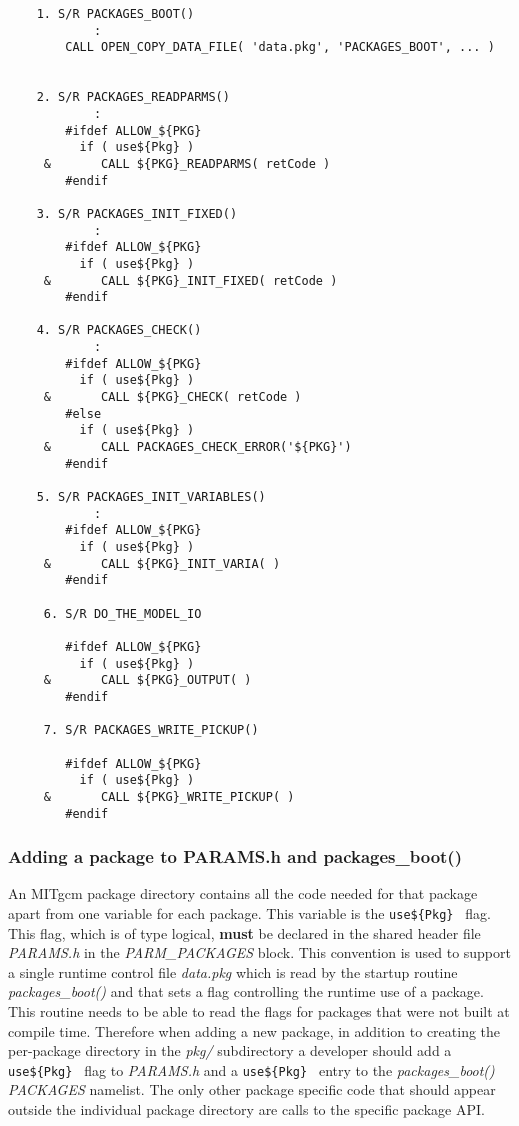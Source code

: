 {\footnotesize
\begin{verbatim}
    1. S/R PACKAGES_BOOT()
            :
        CALL OPEN_COPY_DATA_FILE( 'data.pkg', 'PACKAGES_BOOT', ... )
 

    2. S/R PACKAGES_READPARMS()
            :
        #ifdef ALLOW_${PKG}
          if ( use${Pkg} )
     &       CALL ${PKG}_READPARMS( retCode )
        #endif

    3. S/R PACKAGES_INIT_FIXED()
            :
        #ifdef ALLOW_${PKG}
          if ( use${Pkg} )
     &       CALL ${PKG}_INIT_FIXED( retCode )
        #endif

    4. S/R PACKAGES_CHECK()
            :
        #ifdef ALLOW_${PKG}
          if ( use${Pkg} )
     &       CALL ${PKG}_CHECK( retCode )
        #else
          if ( use${Pkg} )
     &       CALL PACKAGES_CHECK_ERROR('${PKG}')
        #endif

    5. S/R PACKAGES_INIT_VARIABLES()
            :
        #ifdef ALLOW_${PKG}
          if ( use${Pkg} )
     &       CALL ${PKG}_INIT_VARIA( )
        #endif

     6. S/R DO_THE_MODEL_IO

        #ifdef ALLOW_${PKG}
          if ( use${Pkg} )
     &       CALL ${PKG}_OUTPUT( )
        #endif

     7. S/R PACKAGES_WRITE_PICKUP()

        #ifdef ALLOW_${PKG}
          if ( use${Pkg} )
     &       CALL ${PKG}_WRITE_PICKUP( )
        #endif\end{verbatim}
}


\subsubsection{Adding a package to PARAMS.h and  packages\_boot()}

An MITgcm package directory contains all the code needed for that package apart
from one variable for each package. This variable is the {\tt use\$\{Pkg\} } 
flag. This flag, which is of type logical, {\bf must} be declared in the 
shared header file {\it PARAMS.h} in the {\it PARM\_PACKAGES} block. This 
convention is used to support a single runtime control file {\it data.pkg} 
which is read by the startup routine {\it packages\_boot()} and that sets a 
flag controlling the runtime use of a package. This routine needs to be able to 
read the flags for packages that were not built at compile time. Therefore
when adding a new package, in addition to creating the per-package directory
in the {\it pkg/} subdirectory a developer should add a {\tt use\$\{Pkg\} }
flag to {\it PARAMS.h} and a {\tt use\$\{Pkg\} } entry to the 
{\it packages\_boot()} {\it PACKAGES} namelist.
The only other package specific code that should appear outside the individual 
package directory are calls to the specific package API.


